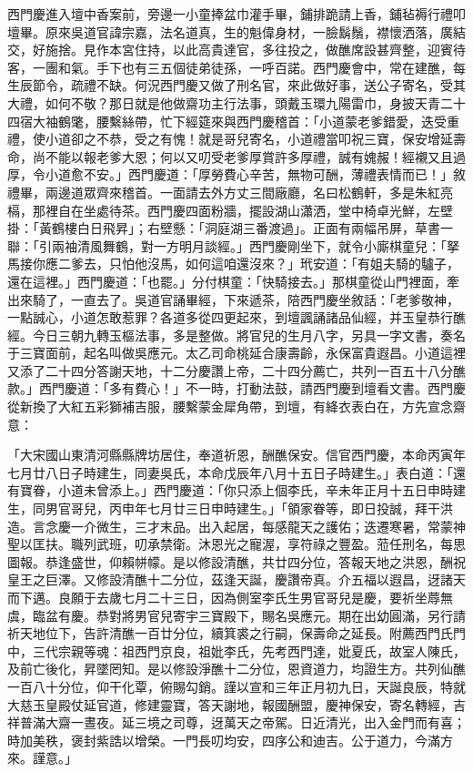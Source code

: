 西門慶進入壇中香案前，旁邊一小童捧盆巾灌手畢，鋪排跪請上香，鋪毡褥行禮叩壇畢。原來吳道官諱宗嘉，法名道真，生的魁偉身材，一臉鬍鬚，襟懷洒落，廣結交，好施捨。見作本宮住持，以此高貴達官，多往投之，做醮席設甚齊整，迎賓待客，一團和氣。手下也有三五個徒弟徒孫，一呼百諾。西門慶會中，常在建醮，每生辰節令，疏禮不缺。何況西門慶又做了刑名官，來此做好事，送公子寄名，受其大禮，如何不敬？那日就是他做齋功主行法事，頭戴玉環九陽雷巾，身披天青二十四宿大袖鶴氅，腰繫絲帶，忙下經筵來與西門慶稽首：「小道蒙老爹錯愛，迭受重禮，使小道卻之不恭，受之有愧！就是哥兒寄名，小道禮當叩祝三寶，保安增延壽命，尚不能以報老爹大恩；何以又叨受老爹厚賞許多厚禮，誠有媿赧！經襯又且過厚，令小道愈不安。」西門慶道：「厚勞費心辛苦，無物可酬，薄禮表情而已！」敘禮畢，兩邊道眾齊來稽首。一面請去外方丈三間廠廳，名曰松鶴軒，多是朱紅亮槅，那裡自在坐處待茶。西門慶四面粉牆，擺設湖山瀟洒，堂中椅卓光鮮，左壁掛：「黃鶴樓白日飛昇」；右壁懸：「洞庭湖三番渡過」。正面有兩幅吊屏，草書一聯：「引兩袖清風舞鶴，對一方明月談經。」西門慶剛坐下，就令小廝棋童兒：「拏馬接你應二爹去，只怕他沒馬，如何這咱還沒來？」玳安道：「有姐夫騎的驢子，還在這裡。」西門慶道：「也罷。」分付棋童：「快騎接去。」那棋童從山門裡面，牽出來騎了，一直去了。吳道官誦畢經，下來遞茶，陪西門慶坐敘話：「老爹敬神，一點誠心，小道怎敢惹罪？各道多從四更起來，到壇諷誦諸品仙經，并玉皇恭行醮經。今日三朝九轉玉樞法事，多是整做。將官兒的生月八字，另具一字文書，奏名于三寶面前，起名叫做吳應元。太乙司命桃延合康壽齡，永保富貴遐昌。小道這裡又添了二十四分答謝天地，十二分慶讚上帝，二十四分薦亡，共列一百五十八分醮款。」西門慶道：「多有費心！」不一時，打動法鼓，請西門慶到壇看文書。西門慶從新換了大紅五彩獅補吉服，腰繫蒙金犀角帶，到壇，有絳衣表白在，方先宣念齋意：

「大宋國山東清河縣縣牌坊居住，奉道祈恩，酬醮保安。信官西門慶，本命丙寅年七月廿八日子時建生，同妻吳氏，本命戊辰年八月十五日子時建生。」表白道：「還有寶眷，小道未曾添上。」西門慶道：「你只添上個李氏，辛未年正月十五日申時建生，同男官哥兒，丙申年七月廿三日申時建生。」「領家眷等，即日投誠，拜干洪造。言念慶一介微生，三才末品。出入起居，每感龍天之護佑；迭遷寒暑，常蒙神聖以匡扶。職列武班，叨承禁衛。沐恩光之寵渥，享符祿之豐盈。蒞任刑名，每思圖報。恭逢盛世，仰賴帡幪。是以修設清醮，共廿四分位，答報天地之洪恩，酬祝皇王之巨澤。又修設清醮十二分位，茲逢天誕，慶讚帝真。介五福以遐昌，迓諸天而下邁。良願于去歲七月二十三日，因為側室李氏生男官哥兒是慶，要祈坐蓐無虞，臨盆有慶。恭對將男官兒寄宇三寶殿下，賜名吳應元。期在出幼圓滿，另行請祈天地位下，告許清醮一百廿分位，續箕裘之行嗣，保壽命之延長。附薦西門氏門中，三代宗親等魂：祖西門京良，祖妣李氏，先考西門達，妣夏氏，故室人陳氏，及前亡後化，昇墜罔知。是以修設淨醮十二分位，恩資道力，均證生方。共列仙醮一百八十分位，仰干化覃，俯賜勾銷。謹以宣和三年正月初九日，天誕良辰，特就大慈玉皇殿仗延官道，修建靈寶，答天謝地，報國酬盟，慶神保安，寄名轉經，吉祥普滿大齋一晝夜。延三境之司尊，迓萬天之帝駕。日近清光，出入金門而有喜；時加美秩，褒封紫誥以增榮。一門長叨均安，四序公和迪吉。公于道力，今滿方來。謹意。」

